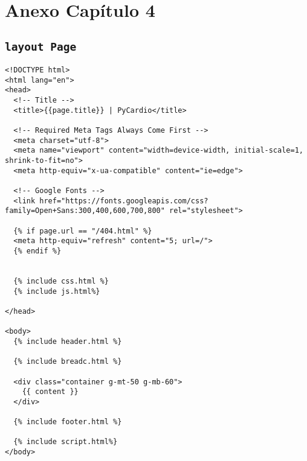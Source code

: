 \chapter{Anexo Capítulo 4}
\section{\texttt{layout Page}}

\begin{lstlisting}[style=htmlcssjs,caption=Layout Page,label={code:layoutPage}]
<!DOCTYPE html>
<html lang="en">
<head>
  <!-- Title -->
  <title>{{page.title}} | PyCardio</title>

  <!-- Required Meta Tags Always Come First -->
  <meta charset="utf-8">
  <meta name="viewport" content="width=device-width, initial-scale=1, shrink-to-fit=no">
  <meta http-equiv="x-ua-compatible" content="ie=edge">

  <!-- Google Fonts -->
  <link href="https://fonts.googleapis.com/css?family=Open+Sans:300,400,600,700,800" rel="stylesheet">

  {% if page.url == "/404.html" %}
  <meta http-equiv="refresh" content="5; url=/">
  {% endif %}


  {% include css.html %}
  {% include js.html%}

</head>

<body>
  {% include header.html %}
  
  {% include breadc.html %}

  <div class="container g-mt-50 g-mb-60">
    {{ content }}
  </div>

  {% include footer.html %}

  {% include script.html%}
</body>
\end{lstlisting}

